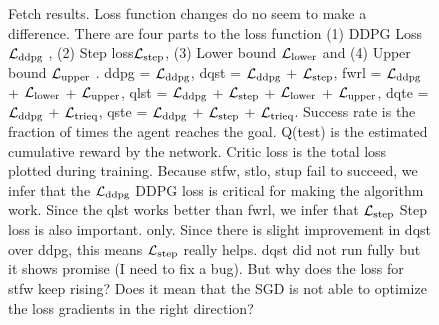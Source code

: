 \begin{figure}
  \caption{
    Fetch results. Loss function changes do no seem to make a difference.
    There are four parts to the loss function (1) DDPG Loss $\mathcal{L}_{\text{ddpg}}$ ,
    (2) Step loss$\mathcal{L}_{\text{step}}$,  
    (3) Lower bound $\mathcal{L}_{\text{lower}}$ and
    (4) Upper bound $\mathcal{L}_{\text{upper}}$ .
    ddpg = $\mathcal{L}_{\text{ddpg}}$,
    dqst = $\mathcal{L}_{\text{ddpg}}$ + $\mathcal{L}_{\text{step}}$,
    fwrl = $\mathcal{L}_{\text{ddpg}}$ + $\mathcal{L}_{\text{lower}}$ +
    $\mathcal{L}_{\text{upper}}$,
    qlst = $\mathcal{L}_{\text{ddpg}}$ + $\mathcal{L}_{\text{step}}$ + $\mathcal{L}_{\text{lower}}$ + $\mathcal{L}_{\text{upper}}$,
    dqte = $\mathcal{L}_{\text{ddpg}}$ + $\mathcal{L}_{\text{trieq}}$,
    qste = $\mathcal{L}_{\text{ddpg}}$ + $\mathcal{L}_{\text{step}}$ + $\mathcal{L}_{\text{trieq}}$.
    Success rate is the fraction of times the agent reaches the goal. Q(test) is
    the estimated cumulative reward by the network. Critic loss is the total
    loss plotted during training.
    Because stfw, stlo, stup fail to succeed, we infer that the $\mathcal{L}_{\text{ddpg}}$ DDPG loss is
    critical for making the algorithm work. Since the qlst works better than
    fwrl, we infer that $\mathcal{L}_{\text{step}}$ Step loss is also important.
    only.
    Since there is slight improvement in dqst over ddpg, this means
    $\mathcal{L}_{\text{step}}$ really helps. dqst did not run fully but it shows
    promise (I need to fix a bug).
    But why does the loss for stfw keep rising? Does it mean that the SGD is not
    able to optimize the loss gradients in the right direction?
  }%
  \label{fig:fwrl-stepfwrl-noop-FetchPush}%
\end{figure}%
% 


%
%
%
%
%
